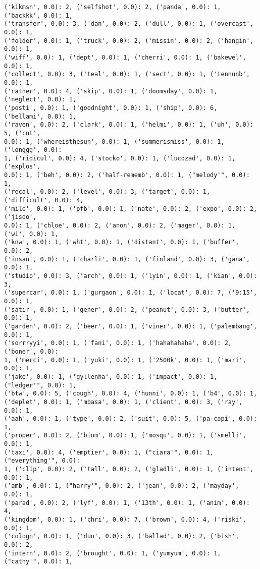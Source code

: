 \documentclass[11pt]{article}
\begin{document}
\begin{Verbatim}[commandchars=\\\{\}]
('kikmsn', 0.0): 2, ('selfshot', 0.0): 2, ('panda', 0.0): 1, ('backkk', 0.0): 1,
('transfer', 0.0): 3, ('dan', 0.0): 2, ('dull', 0.0): 1, ('overcast', 0.0): 1,
('folder', 0.0): 1, ('truck', 0.0): 2, ('missin', 0.0): 2, ('hangin', 0.0): 1,
('wiff', 0.0): 1, ('dept', 0.0): 1, ('cherri', 0.0): 1, ('bakewel', 0.0): 1,
('collect', 0.0): 3, ('teal', 0.0): 1, ('sect', 0.0): 1, ('tennunb', 0.0): 1,
('rather', 0.0): 4, ('skip', 0.0): 1, ('doomsday', 0.0): 1, ('neglect', 0.0): 1,
('posti', 0.0): 1, ('goodnight', 0.0): 1, ('ship', 0.0): 6, ('bellami', 0.0): 1,
('raven', 0.0): 2, ('clark', 0.0): 1, ('helmi', 0.0): 1, ('uh', 0.0): 5, ('cnt',
0.0): 1, ('whereisthesun', 0.0): 1, ('summerismiss', 0.0): 1, ('longgg', 0.0):
1, ('ridicul', 0.0): 4, ('stocko', 0.0): 1, ('lucozad', 0.0): 1, ('explos',
0.0): 1, ('beh', 0.0): 2, ('half-rememb', 0.0): 1, ("melody'", 0.0): 1,
('recal', 0.0): 2, ('level', 0.0): 3, ('target', 0.0): 1, ('difficult', 0.0): 4,
('mile', 0.0): 1, ('pfb', 0.0): 1, ('nate', 0.0): 2, ('expo', 0.0): 2, ('jisoo',
0.0): 1, ('chloe', 0.0): 2, ('anon', 0.0): 2, ('mager', 0.0): 1, ('wi', 0.0): 1,
('knw', 0.0): 1, ('wht', 0.0): 1, ('distant', 0.0): 1, ('buffer', 0.0): 2,
('insan', 0.0): 1, ('charli', 0.0): 1, ('finland', 0.0): 3, ('gana', 0.0): 1,
('studio', 0.0): 3, ('arch', 0.0): 1, ('lyin', 0.0): 1, ('kian', 0.0): 3,
('supercar', 0.0): 1, ('gurgaon', 0.0): 1, ('locat', 0.0): 7, ('9:15', 0.0): 1,
('satir', 0.0): 1, ('gener', 0.0): 2, ('peanut', 0.0): 3, ('butter', 0.0): 1,
('garden', 0.0): 2, ('beer', 0.0): 1, ('viner', 0.0): 1, ('palembang', 0.0): 1,
('sorrryyi', 0.0): 1, ('fani', 0.0): 1, ('hahahahaha', 0.0): 2, ('boner', 0.0):
1, ('merci', 0.0): 1, ('yuki', 0.0): 1, ('2500k', 0.0): 1, ('mari', 0.0): 1,
('jake', 0.0): 1, ('gyllenha', 0.0): 1, ('impact', 0.0): 1, ("ledger'", 0.0): 1,
('btw', 0.0): 5, ('cough', 0.0): 4, ('hunni', 0.0): 1, ('b4', 0.0): 1,
('deplet', 0.0): 1, ('mbasa', 0.0): 1, ('client', 0.0): 3, ('ray', 0.0): 1,
('aah', 0.0): 1, ('type', 0.0): 2, ('suit', 0.0): 5, ('pa-copi', 0.0): 1,
('proper', 0.0): 2, ('biom', 0.0): 1, ('mosqu', 0.0): 1, ('smelli', 0.0): 1,
('taxi', 0.0): 4, ('emptier', 0.0): 1, ("ciara'", 0.0): 1, ("everything'", 0.0):
1, ('clip', 0.0): 2, ('tall', 0.0): 2, ('gladli', 0.0): 1, ('intent', 0.0): 1,
('amb', 0.0): 1, ("harry'", 0.0): 2, ('jean', 0.0): 2, ('mayday', 0.0): 1,
('parad', 0.0): 2, ('lyf', 0.0): 1, ('13th', 0.0): 1, ('anim', 0.0): 4,
('kingdom', 0.0): 1, ('chri', 0.0): 7, ('brown', 0.0): 4, ('riski', 0.0): 1,
('cologn', 0.0): 1, ('duo', 0.0): 3, ('ballad', 0.0): 2, ('bish', 0.0): 2,
('intern', 0.0): 2, ('brought', 0.0): 1, ('yumyum', 0.0): 1, ("cathy'", 0.0): 1,

\end{Verbatim}
\end{document}
